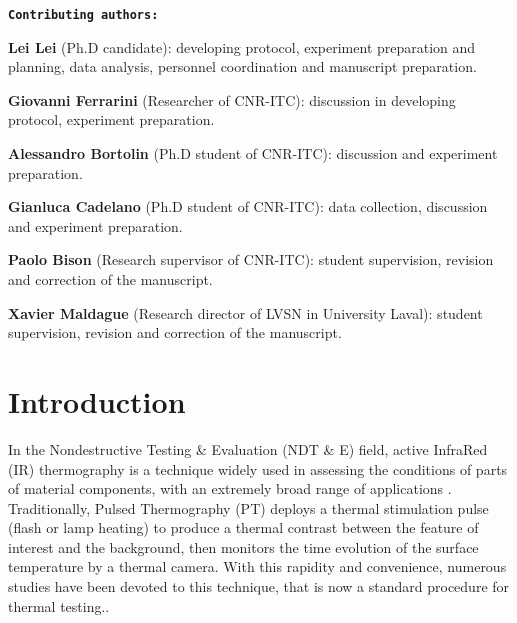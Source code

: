 \newpage
\textbf{\texttt{Contributing authors:}}

\textbf{\textsf{Lei Lei}} (Ph.D candidate): developing protocol, experiment preparation and planning, data analysis,  personnel coordination and manuscript preparation.

\textbf{Giovanni Ferrarini} (Researcher of CNR-ITC): discussion in developing protocol, experiment preparation.

\textbf{Alessandro Bortolin} (Ph.D student of CNR-ITC): discussion and experiment preparation.

\textbf{Gianluca Cadelano} (Ph.D student of CNR-ITC): data collection, discussion and experiment preparation.

\textbf{Paolo Bison} (Research supervisor of CNR-ITC): student supervision, revision and correction of the manuscript. 

\textbf{Xavier Maldague} (Research director of LVSN in University Laval): student supervision, revision and correction of the manuscript.


% 
\newpage
\section{Introduction}
\label{sect:intro}  %
In the Nondestructive Testing \& Evaluation (NDT \& E) field, active InfraRed (IR) thermography \citet{Maldague2001theory} is a technique widely used in assessing the conditions of parts of material components, with an extremely broad range of applications \citet{Vavilov2017Thermal,cadelano2016}. Traditionally, Pulsed Thermography (PT) deploys a thermal stimulation pulse (flash or lamp heating) to produce a thermal contrast between the feature of interest and the background, then monitors the time evolution of the surface temperature by a thermal camera. With this rapidity and convenience, numerous studies have been devoted to this technique, that is now a standard procedure for thermal testing.\citet{Maldague1993Nondestructive,Maldague1994bInfra,2007-Ibarra-Castanedo,2011-ClementeIbarra-Castanedo,duan2013quantitative,vavilov_2015}. 

